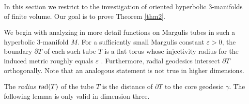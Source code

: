 \documentclass[11pt]{amsart}
\theoremstyle{plain}
\theoremstyle{plain}
\theoremstyle{definition}
\renewcommand{\epsilon}{\varepsilon}
\begin{document}
In this section we restrict to the investigation of orien\-ted 
hy\-per\-bolic 
3-manifolds of finite volume. 
Our goal is to prove Theorem \ref{thm2}. 


 
We begin with analyzing in more detail functions on Margulis tubes 
in such a hyperbolic $3$-manifold $M$. 
For a sufficiently
small Margulis constant
$\epsilon>0$, the boundary $\partial T$ of each such tube $T$ is a flat
torus whose injectivity radius for the induced metric 
roughly equals $\epsilon$ \cite{BCD93}. 
Furthermore, radial geodesics intersect $\partial T$ orthogonally. 
Note that an analogous statement is
not true in higher dimensions.

The \emph{radius} ${\rm rad}(T)$ 
of the tube $T$ is the distance of $\partial T$ to 
the core geodesic $\gamma$. The following lemma is only valid
in dimension three. 
\end{document}
